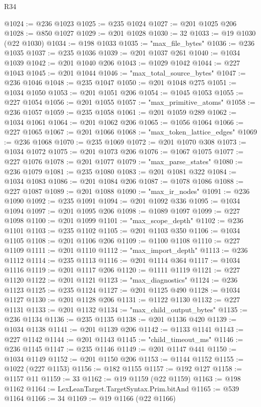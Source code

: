 \begin{lexlean}{R34}
\begin{coremodule}
@1024 := @236 @1023
@1025 := @235 @1024
@1027 := @201 @1025 @206
@1028 := @850 @1027
@1029 := @201 @1028
@1030 := 32
@1033 := @19 @1030 (@22 @1030)
@1034 := @198 @1033
@1035 := "max_file_bytes"
@1036 := @236 @1035
@1037 := @235 @1036
@1039 := @201 @1037 @261
@1040 := @1034 @1039
@1042 := @201 @1040 @206
@1043 := @1029 @1042
@1044 := @227 @1043
@1045 := @201 @1044
@1046 := "max_total_source_bytes"
@1047 := @236 @1046
@1048 := @235 @1047
@1050 := @201 @1048 @275
@1051 := @1034 @1050
@1053 := @201 @1051 @206
@1054 := @1045 @1053
@1055 := @227 @1054
@1056 := @201 @1055
@1057 := "max_primitive_atoms"
@1058 := @236 @1057
@1059 := @235 @1058
@1061 := @201 @1059 @289
@1062 := @1034 @1061
@1064 := @201 @1062 @206
@1065 := @1056 @1064
@1066 := @227 @1065
@1067 := @201 @1066
@1068 := "max_token_lattice_edges"
@1069 := @236 @1068
@1070 := @235 @1069
@1072 := @201 @1070 @308
@1073 := @1034 @1072
@1075 := @201 @1073 @206
@1076 := @1067 @1075
@1077 := @227 @1076
@1078 := @201 @1077
@1079 := "max_parse_states"
@1080 := @236 @1079
@1081 := @235 @1080
@1083 := @201 @1081 @322
@1084 := @1034 @1083
@1086 := @201 @1084 @206
@1087 := @1078 @1086
@1088 := @227 @1087
@1089 := @201 @1088
@1090 := "max_ir_nodes"
@1091 := @236 @1090
@1092 := @235 @1091
@1094 := @201 @1092 @336
@1095 := @1034 @1094
@1097 := @201 @1095 @206
@1098 := @1089 @1097
@1099 := @227 @1098
@1100 := @201 @1099
@1101 := "max_scope_depth"
@1102 := @236 @1101
@1103 := @235 @1102
@1105 := @201 @1103 @350
@1106 := @1034 @1105
@1108 := @201 @1106 @206
@1109 := @1100 @1108
@1110 := @227 @1109
@1111 := @201 @1110
@1112 := "max_import_depth"
@1113 := @236 @1112
@1114 := @235 @1113
@1116 := @201 @1114 @364
@1117 := @1034 @1116
@1119 := @201 @1117 @206
@1120 := @1111 @1119
@1121 := @227 @1120
@1122 := @201 @1121
@1123 := "max_diagnostics"
@1124 := @236 @1123
@1125 := @235 @1124
@1127 := @201 @1125 @490
@1128 := @1034 @1127
@1130 := @201 @1128 @206
@1131 := @1122 @1130
@1132 := @227 @1131
@1133 := @201 @1132
@1134 := "max_child_output_bytes"
@1135 := @236 @1134
@1136 := @235 @1135
@1138 := @201 @1136 @420
@1139 := @1034 @1138
@1141 := @201 @1139 @206
@1142 := @1133 @1141
@1143 := @227 @1142
@1144 := @201 @1143
@1145 := "child_timeout_ms"
@1146 := @236 @1145
@1147 := @235 @1146
@1149 := @201 @1147 @441
@1150 := @1034 @1149
@1152 := @201 @1150 @206
@1153 := @1144 @1152
@1155 := @1022 (@227 @1153)
@1156 := @182 @1155
@1157 := @192 @127
@1158 := @1157 @11
@1159 := 33
@1162 := @19 @1159 (@22 @1159)
@1163 := @198 @1162
@1164 := LexLeanTarget.TargetSyntax.Prim.bitAnd
@1165 := @539 @1164
@1166 := 34
@1169 := @19 @1166 (@22 @1166)

\end{coremodule}
\end{lexlean}
